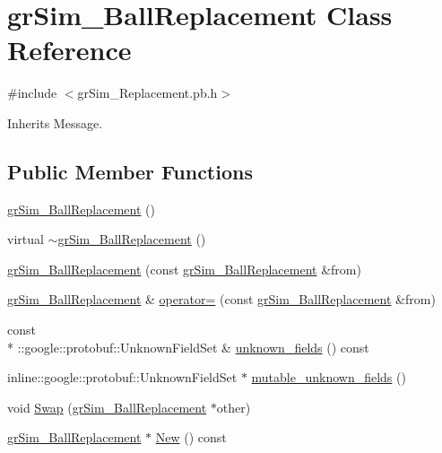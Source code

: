 \hypertarget{classgr_sim___ball_replacement}{\section{gr\-Sim\-\_\-\-Ball\-Replacement Class Reference}
\label{classgr_sim___ball_replacement}
}


{\ttfamily \#include $<$gr\-Sim\-\_\-\-Replacement.\-pb.\-h$>$}



Inherits Message.

\subsection*{Public Member Functions}
\begin{DoxyCompactItemize}
\item 
\hyperlink{classgr_sim___ball_replacement_af8aef6b834361a73c14fbbf12a4a07a2}{gr\-Sim\-\_\-\-Ball\-Replacement} ()
\item 
virtual \hyperlink{classgr_sim___ball_replacement_a07b6f2aa7f97624309788e72fe5055f3}{$\sim$gr\-Sim\-\_\-\-Ball\-Replacement} ()
\item 
\hyperlink{classgr_sim___ball_replacement_ab24dedfdfde5f267b73b26abb10478ad}{gr\-Sim\-\_\-\-Ball\-Replacement} (const \hyperlink{classgr_sim___ball_replacement}{gr\-Sim\-\_\-\-Ball\-Replacement} \&from)
\item 
\hyperlink{classgr_sim___ball_replacement}{gr\-Sim\-\_\-\-Ball\-Replacement} \& \hyperlink{classgr_sim___ball_replacement_aafc60c407a6976669d86492a8a8031ca}{operator=} (const \hyperlink{classgr_sim___ball_replacement}{gr\-Sim\-\_\-\-Ball\-Replacement} \&from)
\item 
const \\*
\-::google\-::protobuf\-::\-Unknown\-Field\-Set \& \hyperlink{classgr_sim___ball_replacement_a0c2d3f160d92af99935bb7c66410de25}{unknown\-\_\-fields} () const 
\item 
inline\-::google\-::protobuf\-::\-Unknown\-Field\-Set $\ast$ \hyperlink{classgr_sim___ball_replacement_ab967000f2a8b93376c99dcd51827aab4}{mutable\-\_\-unknown\-\_\-fields} ()
\item 
void \hyperlink{classgr_sim___ball_replacement_a4cc310a58527f51037f8eb174b0c463b}{Swap} (\hyperlink{classgr_sim___ball_replacement}{gr\-Sim\-\_\-\-Ball\-Replacement} $\ast$other)
\item 
\hyperlink{classgr_sim___ball_replacement}{gr\-Sim\-\_\-\-Ball\-Replacement} $\ast$ \hyperlink{classgr_sim___ball_replacement_a324a18abbcd0c29371714dfc30a9fe93}{New} () const 

\end{DoxyCompactItemize}
